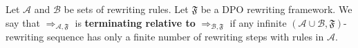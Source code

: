 \begin{definition}
    \label{termination:def:relative_termination}
     Let $\mathcal{A}$ and $\mathcal{B}$ be sets of rewriting rules. Let $\mathfrak{F}$ be a DPO rewriting framework. We say that $\Rightarrow_{\mathcal{A},\mathfrak{F}}$ is \textbf{terminating relative to} $\Rightarrow_{\mathcal{B}, \mathfrak{F}}$ if any infinite $(\mathcal{A} \cup \mathcal{B},\mathfrak{F})$-rewriting sequence has only a finite number of rewriting steps with rules in $\mathcal{A}$.
\end{definition}